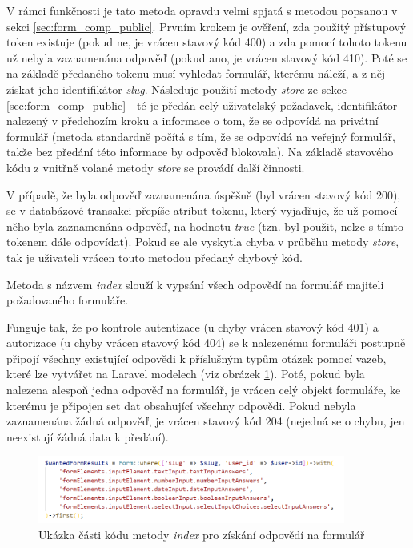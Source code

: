 			V rámci funkčnosti je tato metoda opravdu velmi spjatá s metodou popsanou v sekci \ref{sec:form_comp_public}. Prvním krokem je ověření, zda použitý přístupový token existuje (pokud ne, je vrácen stavový kód 400) a zda pomocí tohoto tokenu už nebyla zaznamenána odpověď (pokud ano, je vrácen stavový kód 410). Poté se na základě předaného tokenu musí vyhledat formulář, kterému náleží, a z něj získat jeho identifikátor \textit{slug}. Následuje použití metody \textit{store} ze sekce \ref{sec:form_comp_public} - té je předán celý uživatelský požadavek, identifikátor nalezený v předchozím kroku a informace o tom, že se odpovídá na privátní formulář (metoda standardně počítá s tím, že se odpovídá na veřejný formulář, takže bez předání této informace by odpověď blokovala). Na základě stavového kódu z vnitřně volané metody \textit{store} se provádí další činnosti. 
			
			V případě, že byla odpověď zaznamenána úspěšně (byl vrácen stavový kód 200), se v databázové transakci přepíše atribut tokenu, který vyjadřuje, že už pomocí něho byla zaznamenána odpověď, na hodnotu \textit{true} (tzn. byl použit, nelze s tímto tokenem dále odpovídat). Pokud se ale vyskytla chyba v průběhu metody \textit{store}, tak je uživateli vrácen touto metodou předaný chybový kód.
			
			\label{sec:form_comp_private_index}
			Metoda s názvem \textit{index} slouží k vypsání všech odpovědí na formulář majiteli požadovaného formuláře.
			
			Funguje tak, že po kontrole autentizace (u chyby vrácen stavový kód 401) a autorizace (u chyby vrácen stavový kód 404) se k nalezenému formuláři postupně připojí všechny existující odpovědi k příslušným typům otázek pomocí vazeb, které lze vytvářet na Laravel modelech (viz obrázek \ref{fig:vraceni_vsech_vysledku}). Poté, pokud byla nalezena alespoň jedna odpověď na formulář, je vrácen celý objekt formuláře, ke kterému je připojen set dat obsahující všechny odpovědi. Pokud nebyla zaznamenána žádná odpověď, je vrácen stavový kód 204 (nejedná se o chybu, jen neexistují žádná data k předání).
			
			\begin{figure}[h]
				\centering
				\includegraphics[width=0.9\textwidth]{img/vraceni_vsech_vysledku.png}
				\caption{Ukázka části kódu metody \textit{index} pro získání odpovědí na formulář}
				\label{fig:vraceni_vsech_vysledku}
			\end{figure}
			
